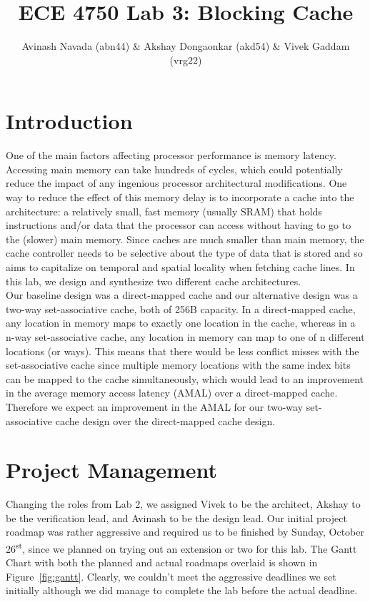\documentclass[10pt]{article}
\begin{document}
\title{ECE 4750 Lab 3: Blocking Cache}
\author{Avinash Navada (abn44) \& Akshay Dongaonkar (akd54) \& Vivek Gaddam (vrg22)}
\maketitle


\section{Introduction}

One of the main factors affecting processor performance is memory latency. Accessing main memory can take hundreds of cycles, which could potentially reduce the impact of any ingenious processor architectural modifications. One way to reduce the effect of this memory delay is to incorporate a cache into the architecture: a relatively small, fast memory (usually SRAM) that holds instructions and/or data that the processor can access without having to go to the (slower) main memory. Since caches are much smaller than main memory, the cache controller needs to be selective about the type of data that is stored and so aims to capitalize on temporal and spatial locality when fetching cache lines. In this lab, we design and synthesize two different cache architectures.  \\

Our baseline design was a direct-mapped cache and our alternative design was a two-way set-associative cache, both of 256B capacity. In a direct-mapped cache, any location in memory maps to exactly one location in the cache, whereas in a n-way set-associative cache, any location in memory can map to one of n different locations (or ways). This means that there would be less conflict misses with the set-associative cache since multiple memory locations with the same index bits can be mapped to the cache simultaneously, which would lead to an improvement in the average memory access latency (AMAL) over a direct-mapped cache. Therefore we expect an improvement in the AMAL for our two-way set-associative cache design over the direct-mapped cache design.


\section{Project Management}

Changing the roles from Lab 2, we assigned Vivek to be the architect, Akshay to be the verification lead, and Avinash to be the design lead.
Our initial project roadmap was rather aggressive and required us to be finished by Sunday, October 26\textsuperscript{st}, since we planned on trying out an extension or two for this lab. The Gantt Chart with both the planned and actual roadmaps overlaid is shown in Figure~\ref{fig:gantt}. Clearly, we couldn't meet the aggressive deadlines we set initially although we did manage to complete the lab before the actual deadline. \\
\end{document}
